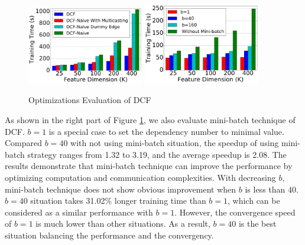 \documentclass{llncs}
\begin{document}
\begin{figure}[!t]
\centering
\includegraphics[width=2in]{pics/opt.pdf}
\includegraphics[width=2in]{pics/mb.pdf}
\vspace{-10pt}
\caption{Optimizations Evaluation of DCF}
\label{fig:opt}
\end{figure}


As shown in the right part of Figure \ref{fig:opt}, we also evaluate mini-batch technique of DCF. $b = 1$ is a special case to set the dependency number to minimal value. Compared $b=40$ with not using mini-batch situation, the speedup of using mini-batch strategy ranges from 1.32 to 3.19, and the average speedup is 2.08. The results demonstrate that mini-batch technique can improve the performance by optimizing computation and communication complexities. With decreasing $b$, mini-batch technique does not show obvious improvement when $b$ is less than 40. $b=40$ situation takes 31.02\% longer training time than $b=1$, which can be considered as a similar performance with $b=1$. However, the convergence speed of $b=1$ is much lower than other situations. As a result, $b=40$ is the best situation balancing the performance and the convergency.
\end{document}
